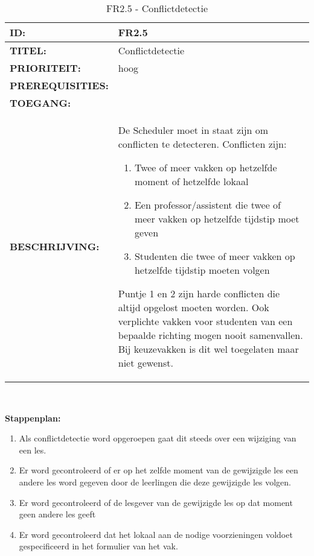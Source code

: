         
\noindent\begin{table}[H]
            \begin{tabular}{l | p{10cm}}
                \textbf{ID:} & FR2.5 \\ \hline
                \textbf{TITEL:} & Conflictdetectie\\ \hline
                \textbf{PRIORITEIT:} & hoog \\ \hline
                \textbf{PREREQUISITIES:} & \\ \hline
                \textbf{TOEGANG:} &  \\ \hline
                \textbf{BESCHRIJVING:} & De Scheduler moet in staat zijn om conflicten te detecteren. Conflicten zijn: 
                \begin{enumerate}
                \item Twee of meer vakken op hetzelfde moment of hetzelfde lokaal
                \item Een professor/assistent  die twee of meer vakken op hetzelfde tijdstip moet geven 
                \item Studenten die twee of meer vakken op hetzelfde tijdstip moeten volgen
                \end{enumerate}
                Puntje 1 en 2 zijn harde conflicten die altijd opgelost moeten worden. Ook verplichte vakken voor studenten van een bepaalde richting mogen nooit samenvallen. Bij keuzevakken is dit wel toegelaten maar niet gewenst.\\
            \end{tabular}\\
            \caption{FR2.5 - Conflictdetectie}
            \label{tab:FR2.5 - Conflictdetectie}
        \end{table}
        
\textbf{Stappenplan:}
	\begin{enumerate}
	\item Als conflictdetectie word opgeroepen gaat dit steeds over een wijziging van een les.
	\item Er word gecontroleerd of er op het zelfde moment van de gewijzigde les een andere les word gegeven door de leerlingen die deze gewijzigde les volgen.
	\item Er word gecontroleerd of de lesgever van de gewijzigde les op dat moment geen andere les geeft
	\item Er word gecontroleerd dat het lokaal aan de nodige voorzieningen voldoet gespecificeerd in het formulier van het vak. 
	\end{enumerate}

\clearpage